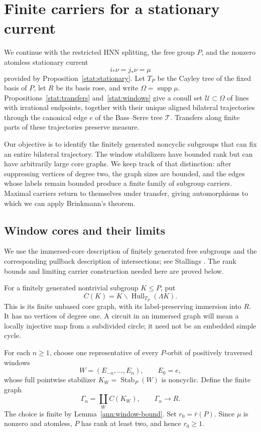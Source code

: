 \section{Finite carriers for a stationary current}
\label{car:section}

We continue with the restricted HNN splitting, the free group $P$, and the
nonzero atomless stationary current
\[
 i_*\nu=j_*\nu=\mu
\]
provided by Proposition~\ref{stat:stationary}.  Let $T_P$ be the Cayley tree
of the fixed basis of $P$, let $R$ be its basis rose, and write
$\Omega=\operatorname{supp}\mu$.  Propositions~\ref{stat:transfers}
and~\ref{stat:windows} give a conull set $\mathcal U\subset\Omega$ of
lines with irrational endpoints, together with their unique aligned
bilateral trajectories through the canonical edge $e$ of the
Bass--Serre tree $\mathcal T$.  Transfers along finite parts of these
trajectories preserve measure.

Our objective is to identify the finitely generated noncyclic subgroups
that can fix an entire bilateral trajectory.  The window stabilizers
have bounded rank but can have arbitrarily large core graphs.  We keep
track of that distinction: after suppressing vertices of degree two,
the graph sizes are bounded, and the edges whose labels remain bounded
produce a finite family of subgroup carriers.  Maximal carriers return
to themselves under transfer, giving automorphisms to which we can
apply Brinkmann's theorem.

\subsection{Window cores and their limits}

We use the immersed-core description of finitely generated free
subgroups and the corresponding pullback description of intersections;
see Stallings \cite[Section~3.3, Theorem~5.5, and Section~7]{Stallings1983}.
The rank bounds and limiting carrier construction needed here are
proved below.

For a finitely generated nontrivial subgroup $K\le P$, put
\[
 C(K)=K\backslash\operatorname{Hull}_{T_P}(\Lambda K).
\]
This is its finite unbased core graph, with its label-preserving
immersion into $R$.  It has no vertices of degree one.  A circuit in an
immersed graph will mean a locally injective map from a subdivided
circle; it need not be an embedded simple cycle.

For each $n\ge1$, choose one representative of every $P$-orbit of
positively traversed windows
\[
 W=(E_{-n},\ldots,E_n),\qquad E_0=e,
\]
whose full pointwise stabilizer $K_W=\operatorname{Stab}_P(W)$ is noncyclic.
Define the finite graph
\[
 \Gamma_n=\coprod_W C(K_W),
 \qquad \Gamma_n\longrightarrow R.
\]
The choice is finite by Lemma~\ref{ann:window-bound}.  Set
$r_0=\bar r(P)$.  Since $\mu$ is nonzero and atomless, $P$ has rank at
least two, and hence $r_0\ge1$.

